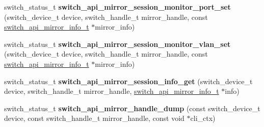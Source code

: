 \begin{DoxyCompactItemize}
\item 
\hypertarget{group__Mirror_ga37524c7bbec3e24a919ea2d92cd98284}{switch\+\_\+status\+\_\+t {\bfseries switch\+\_\+api\+\_\+mirror\+\_\+session\+\_\+monitor\+\_\+port\+\_\+set} (switch\+\_\+device\+\_\+t device, switch\+\_\+handle\+\_\+t mirror\+\_\+handle, const \hyperlink{group__Mirror_gac1b339df3793f4dfdd6603bb17b36f0a}{switch\+\_\+api\+\_\+mirror\+\_\+info\+\_\+t} $\ast$mirror\+\_\+info)}\label{group__Mirror_ga37524c7bbec3e24a919ea2d92cd98284}

\item 
\hypertarget{group__Mirror_gaeb69501fdc0c9fd9992c53930918fdad}{switch\+\_\+status\+\_\+t {\bfseries switch\+\_\+api\+\_\+mirror\+\_\+session\+\_\+monitor\+\_\+vlan\+\_\+set} (switch\+\_\+device\+\_\+t device, switch\+\_\+handle\+\_\+t mirror\+\_\+handle, const \hyperlink{group__Mirror_gac1b339df3793f4dfdd6603bb17b36f0a}{switch\+\_\+api\+\_\+mirror\+\_\+info\+\_\+t} $\ast$mirror\+\_\+info)}\label{group__Mirror_gaeb69501fdc0c9fd9992c53930918fdad}

\item 
\hypertarget{group__Mirror_ga2dfc48e1e96a6dab11de7054171023fa}{switch\+\_\+status\+\_\+t {\bfseries switch\+\_\+api\+\_\+mirror\+\_\+session\+\_\+info\+\_\+get} (switch\+\_\+device\+\_\+t device, switch\+\_\+handle\+\_\+t mirror\+\_\+handle, \hyperlink{group__Mirror_gac1b339df3793f4dfdd6603bb17b36f0a}{switch\+\_\+api\+\_\+mirror\+\_\+info\+\_\+t} $\ast$info)}\label{group__Mirror_ga2dfc48e1e96a6dab11de7054171023fa}

\item 
\hypertarget{group__Mirror_gaf92b680254816b9b57ae463ff1b98312}{switch\+\_\+status\+\_\+t {\bfseries switch\+\_\+api\+\_\+mirror\+\_\+handle\+\_\+dump} (const switch\+\_\+device\+\_\+t device, const switch\+\_\+handle\+\_\+t mirror\+\_\+handle, const void $\ast$cli\+\_\+ctx)}\label{group__Mirror_gaf92b680254816b9b57ae463ff1b98312}

\end{DoxyCompactItemize}


